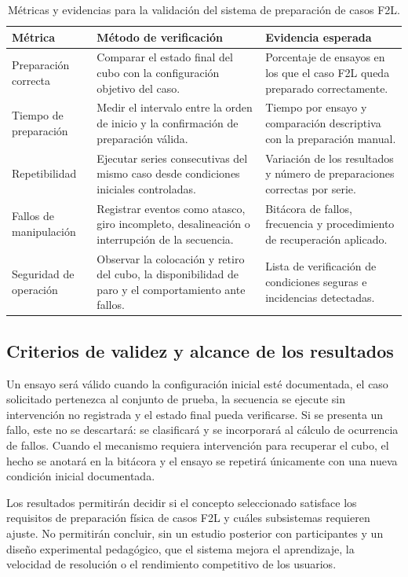 \begin{table}[H]
\centering
\footnotesize
\renewcommand{\arraystretch}{1.15}
\begin{tabularx}{\textwidth}{|p{3.0cm}|p{3.5cm}|X|}
\hline
\textbf{Métrica} & \textbf{Método de verificación} & \textbf{Evidencia esperada} \\ \hline
Preparación correcta & Comparar el estado final del cubo con la configuración objetivo del caso. & Porcentaje de ensayos en los que el caso F2L queda preparado correctamente. \\ \hline
Tiempo de preparación & Medir el intervalo entre la orden de inicio y la confirmación de preparación válida. & Tiempo por ensayo y comparación descriptiva con la preparación manual. \\ \hline
Repetibilidad & Ejecutar series consecutivas del mismo caso desde condiciones iniciales controladas. & Variación de los resultados y número de preparaciones correctas por serie. \\ \hline
Fallos de manipulación & Registrar eventos como atasco, giro incompleto, desalineación o interrupción de la secuencia. & Bitácora de fallos, frecuencia y procedimiento de recuperación aplicado. \\ \hline
Seguridad de operación & Observar la colocación y retiro del cubo, la disponibilidad de paro y el comportamiento ante fallos. & Lista de verificación de condiciones seguras e incidencias detectadas. \\ \hline
\end{tabularx}
\caption{Métricas y evidencias para la validación del sistema de preparación de casos F2L.}
\label{tab:metricas-validacion-f2l}
\end{table}

\clearpage
\subsection{Criterios de validez y alcance de los resultados}

Un ensayo será válido cuando la configuración inicial esté documentada, el caso solicitado pertenezca al conjunto de prueba, la secuencia se ejecute sin intervención no registrada y el estado final pueda verificarse. Si se presenta un fallo, este no se descartará: se clasificará y se incorporará al cálculo de ocurrencia de fallos. Cuando el mecanismo requiera intervención para recuperar el cubo, el hecho se anotará en la bitácora y el ensayo se repetirá únicamente con una nueva condición inicial documentada.

Los resultados permitirán decidir si el concepto seleccionado satisface los requisitos de preparación física de casos F2L y cuáles subsistemas requieren ajuste. No permitirán concluir, sin un estudio posterior con participantes y un diseño experimental pedagógico, que el sistema mejora el aprendizaje, la velocidad de resolución o el rendimiento competitivo de los usuarios.

\clearpage
